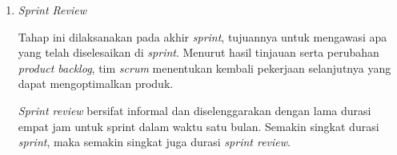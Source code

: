 \begin{enumerate}
\begin{enumerate}
		\break
		\item \emph{Sprint Review}
		
		Tahap ini dilaksanakan pada akhir \emph{sprint}, tujuannya untuk mengawasi apa yang telah diselesaikan di \emph{sprint}. Menurut hasil tinjauan serta perubahan \emph{product backlog}, tim \emph{scrum} menentukan kembali pekerjaan selanjutnya yang dapat mengoptimalkan produk.
		
		\emph{Sprint review} bersifat informal dan diselenggarakan dengan lama durasi empat jam untuk sprint dalam waktu satu bulan. Semakin singkat durasi \emph{sprint}, maka semakin singkat juga durasi \emph{sprint review}.
		
	\end{enumerate}
	
\end{enumerate}

